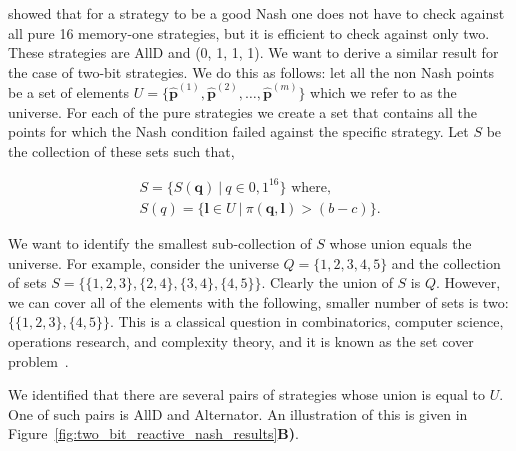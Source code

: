 \documentclass{article}
\theoremstyle{definition}
\begin{document}
\citep{akin:EGADS:2016} showed that for a strategy to be a good Nash one does
not have to check against all pure 16 memory-one strategies, but it is efficient
to check against only two. These strategies are AllD and (0, 1, 1, 1). We want
to derive a similar result for the case of two-bit strategies. We do this as
follows: let all the non Nash points be a
set of elements \(U = \{ \mathbf{\hat{p}}^{(1)}, \mathbf{\hat{p}}^{(2)}, \dots,
\mathbf{\hat{p}}^{(m)}\}\) which we refer to as the universe. For each of the
pure strategies we create a set that contains all the points for which the Nash
condition failed against the specific strategy. Let \(S\) be the collection of
these sets such that,

\begin{align*}
  S = \{S(\mathbf{q}) \ | \ q \in {0, 1} ^ {16} \} \text{ where,}\\
  S(q) = \{\mathbf{l} \in U \ | \ \pi( \mathbf{q},  \mathbf{l}) > (b - c)\}.
\end{align*}

We want to identify the smallest sub-collection of \(S\) whose union equals the
universe. For example, consider the universe \(Q = \{1, 2, 3, 4, 5\}\) and the
collection of sets \(S = \{ \{1, 2, 3\}, \{2, 4\}, \{3, 4\}, \{4, 5\} \}\).
Clearly the union of \(S\) is \(Q\). However, we can cover all of the elements
with the following, smaller number of sets is two: \(\{ \{1, 2, 3\}, \{4, 5\}
\}\). This is a classical question in combinatorics, computer science,
operations research, and complexity theory, and it is known as the set cover
problem~\citep{beasley:EJOR:1987}.

We identified that there are several pairs of strategies whose union is
equal to \(U\). One of such pairs is AllD and Alternator. An
illustration of this is
given in Figure~\ref{fig:two_bit_reactive_nash_results}\textbf{B)}.
\end{document}
